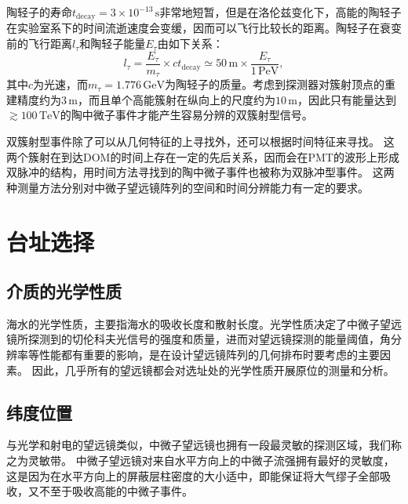 陶轻子的寿命$t_\mathrm{decay} = 3\times10^{-13} \,\mathrm{s}$非常地短暂，但是在洛伦兹变化下，高能的陶轻子在实验室系下的时间流逝速度会变缓，因而可以飞行比较长的距离。陶轻子在衰变前的飞行距离$l_\tau$和陶轻子能量$E_\tau$由如下关系：
\begin{equation}
    l_\tau = \frac{E_\tau}{m_\tau} \times c t_\mathrm{decay} \simeq 50\,\mathrm{m} \times \frac{E_\tau}{1\,\mathrm{PeV}} ,
    \label{eq:tau_decay}
\end{equation}
其中$c$为光速，而$m_\tau=1.776 \,\mathrm{GeV}$为陶轻子的质量。考虑到探测器对簇射顶点的重建精度约为$3\,\mathrm{m}$，而且单个高能簇射在纵向上的尺度约为$10\,\mathrm{m}$，因此只有能量达到$\gtrsim 100 \, \mathrm{TeV}$的陶中微子事件才能产生容易分辨的双簇射型信号。

双簇射型事件除了可以从几何特征的上寻找外\cite{IceCube_tau:2020}，还可以根据时间特征来寻找。
这两个簇射在到达DOM的时间上存在一定的先后关系，因而会在PMT的波形上形成双脉冲的结构，用时间方法寻找到的陶中微子事件也被称为双脉冲型事件\cite{IceCube_tau_Donglian:2015, IceCube_tau_Logan:2019, Tian_tau_double_pulse:2021}。
这两种测量方法分别对中微子望远镜阵列的空间和时间分辨能力有一定的要求。

\section{台址选择}

\subsection{介质的光学性质}

海水的光学性质，主要指海水的吸收长度和散射长度。光学性质决定了中微子望远镜所探测到的切伦科夫光信号的强度和质量，进而对望远镜探测的能量阈值，角分辨率等性能都有重要的影响，是在设计望远镜阵列的几何排布时要考虑的主要因素。
因此，几乎所有的望远镜都会对选址处的光学性质开展原位的测量和分析\cite{OP_ANTARES:2004, OP_Baikal:2012, OP_Grace:2018, OP_IceCube:2006, OP_IceCube:2013, OP_NEMO:2006, OP_P-One:2021}。

\subsection{纬度位置}

与光学和射电的望远镜类似，中微子望远镜也拥有一段最灵敏的探测区域，我们称之为灵敏带。
中微子望远镜对来自水平方向上的中微子流强拥有最好的灵敏度，这是因为在水平方向上的屏蔽层柱密度的大小适中，即能保证将大气缪子全部吸收，又不至于吸收高能的中微子事件。

